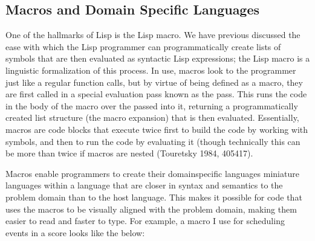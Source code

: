 \documentclass[letterpaper,10pt,english]{sphinxmanual}
\begin{document}
\subsection{Macros and Domain Specific Languages}
\label{\detokenize{design:macros-and-domain-specific-languages}}
\sphinxAtStartPar
One of the hallmarks of Lisp is the Lisp macro.
We have previous discussed the ease with which the Lisp programmer can programmatically create lists of
symbols that are then evaluated as syntactic Lisp expressions; the Lisp macro is a linguistic formalization of this process.
In use, macros look to the programmer just like a regular function calls, but by virtue of being defined as a macro,
they are first called in a special evaluation pass known as the  pass.
This runs the code in the body of the macro over the  passed into it, returning a
programmatically created list structure (the macro expansion) that is then evaluated.
Essentially, macros are code blocks that execute twice \sphinxhyphen{} first to build the code by working with symbols,
and then to run the code by evaluating it (though
technically this can be more than twice if macros are nested (Touretsky 1984, 405\sphinxhyphen{}417).

\sphinxAtStartPar
Macros enable programmers to create their  domain\sphinxhyphen{}specific languages \sphinxhyphen{}
miniature languages within a language that are closer in syntax and semantics to the problem domain than to the host language.
This makes it possible for code that uses the macros to be visually aligned with the problem domain,
making them easier to read and faster to type.
For example, a macro I use for scheduling events in a score looks like the below:

\begin{sphinxVerbatim}[commandchars=\\\{\}]
\end{sphinxVerbatim}
\end{document}
